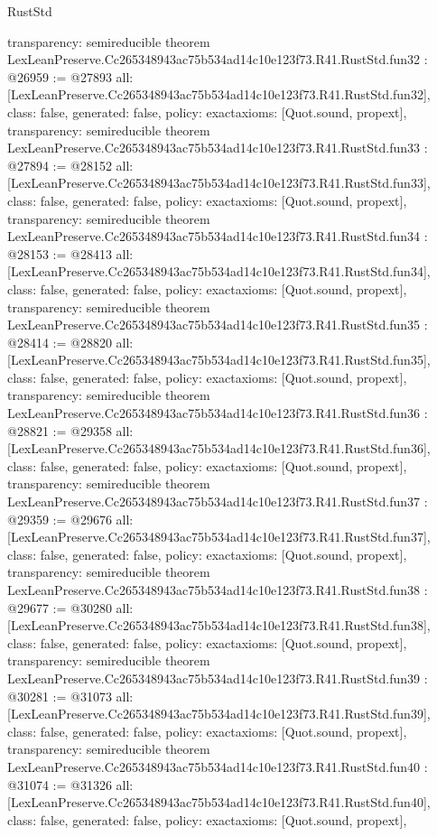 \begin{lexlean}{RustStd}
\begin{coremodule}
{  transparency: semireducible
}
theorem LexLeanPreserve.Cc265348943ac75b534ad14c10e123f73.R41.RustStd.fun32 : @26959 := @27893 {
  all: [LexLeanPreserve.Cc265348943ac75b534ad14c10e123f73.R41.RustStd.fun32],
  class: false,
  generated: false,
  policy: exact{axioms: [Quot.sound, propext]},
  transparency: semireducible
}
theorem LexLeanPreserve.Cc265348943ac75b534ad14c10e123f73.R41.RustStd.fun33 : @27894 := @28152 {
  all: [LexLeanPreserve.Cc265348943ac75b534ad14c10e123f73.R41.RustStd.fun33],
  class: false,
  generated: false,
  policy: exact{axioms: [Quot.sound, propext]},
  transparency: semireducible
}
theorem LexLeanPreserve.Cc265348943ac75b534ad14c10e123f73.R41.RustStd.fun34 : @28153 := @28413 {
  all: [LexLeanPreserve.Cc265348943ac75b534ad14c10e123f73.R41.RustStd.fun34],
  class: false,
  generated: false,
  policy: exact{axioms: [Quot.sound, propext]},
  transparency: semireducible
}
theorem LexLeanPreserve.Cc265348943ac75b534ad14c10e123f73.R41.RustStd.fun35 : @28414 := @28820 {
  all: [LexLeanPreserve.Cc265348943ac75b534ad14c10e123f73.R41.RustStd.fun35],
  class: false,
  generated: false,
  policy: exact{axioms: [Quot.sound, propext]},
  transparency: semireducible
}
theorem LexLeanPreserve.Cc265348943ac75b534ad14c10e123f73.R41.RustStd.fun36 : @28821 := @29358 {
  all: [LexLeanPreserve.Cc265348943ac75b534ad14c10e123f73.R41.RustStd.fun36],
  class: false,
  generated: false,
  policy: exact{axioms: [Quot.sound, propext]},
  transparency: semireducible
}
theorem LexLeanPreserve.Cc265348943ac75b534ad14c10e123f73.R41.RustStd.fun37 : @29359 := @29676 {
  all: [LexLeanPreserve.Cc265348943ac75b534ad14c10e123f73.R41.RustStd.fun37],
  class: false,
  generated: false,
  policy: exact{axioms: [Quot.sound, propext]},
  transparency: semireducible
}
theorem LexLeanPreserve.Cc265348943ac75b534ad14c10e123f73.R41.RustStd.fun38 : @29677 := @30280 {
  all: [LexLeanPreserve.Cc265348943ac75b534ad14c10e123f73.R41.RustStd.fun38],
  class: false,
  generated: false,
  policy: exact{axioms: [Quot.sound, propext]},
  transparency: semireducible
}
theorem LexLeanPreserve.Cc265348943ac75b534ad14c10e123f73.R41.RustStd.fun39 : @30281 := @31073 {
  all: [LexLeanPreserve.Cc265348943ac75b534ad14c10e123f73.R41.RustStd.fun39],
  class: false,
  generated: false,
  policy: exact{axioms: [Quot.sound, propext]},
  transparency: semireducible
}
theorem LexLeanPreserve.Cc265348943ac75b534ad14c10e123f73.R41.RustStd.fun40 : @31074 := @31326 {
  all: [LexLeanPreserve.Cc265348943ac75b534ad14c10e123f73.R41.RustStd.fun40],
  class: false,
  generated: false,
  policy: exact{axioms: [Quot.sound, propext]},
}
\end{coremodule}
\end{lexlean}
